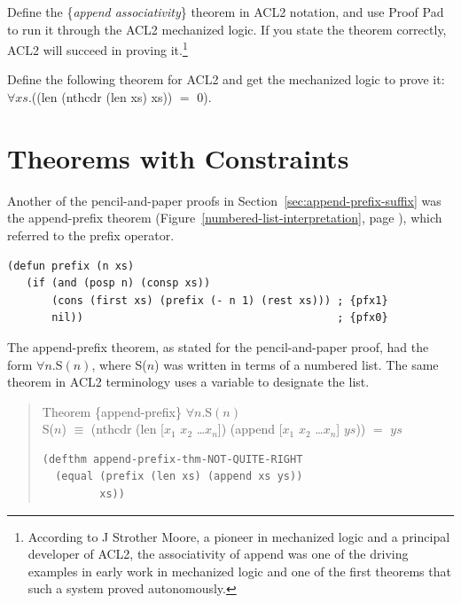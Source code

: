 \begin{ExerciseList}

\Exercise Define the
\{\emph{append associativity}\}
theorem in ACL2 notation,
and use Proof Pad to run it through the ACL2 mechanized logic.
If you state the theorem correctly, ACL2 will succeed in proving it.\footnote{According
to J Strother Moore, a pioneer
in mechanized logic and a principal developer of ACL2,
the associativity of append was one of the driving examples in early work in
mechanized logic and one of the first theorems that such a system proved autonomously.}

\Exercise Define the following theorem for ACL2 and get the mechanized logic to prove it:
$\forall xs.$((len (nthcdr (len xs) xs)) $=$ 0).

\end{ExerciseList}

\section{Theorems with Constraints}
\label{sec:implies-constraints}

Another of the pencil-and-paper proofs in Section~\ref{sec:append-prefix-suffix}
was the append-prefix theorem 
(Figure~\ref{numbered-list-interpretation}, page \pageref{numbered-list-interpretation}),
which referred to the prefix operator.

\begin{Verbatim}
(defun prefix (n xs)
   (if (and (posp n) (consp xs))
       (cons (first xs) (prefix (- n 1) (rest xs))) ; {pfx1}
       nil))                                        ; {pfx0}
\end{Verbatim}

The append-prefix theorem, as stated for the pencil-and-paper proof,
had the form $\forall n.$S$(n)$,
where S($n$)
was written in terms of a numbered list.
The same theorem in ACL2 terminology uses a variable to designate the list.
\begin{samepage}
\begin{quote}
Theorem \{append-prefix\} $\forall n.$S$(n)$ \\
S($n$) $\equiv$ (nthcdr (len [$x_1$ $x_2$ \dots $x_n$]) (append [$x_1$ $x_2$ \dots $x_n$] $ys$)) $=$ $ys$
\begin{Verbatim}
(defthm append-prefix-thm-NOT-QUITE-RIGHT
  (equal (prefix (len xs) (append xs ys))
         xs))
\end{Verbatim}
\end{quote}
\end{samepage}

